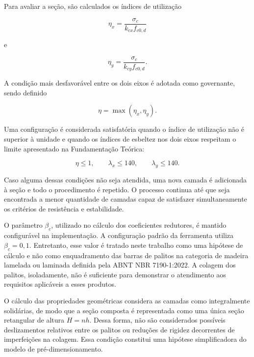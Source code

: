 Para avaliar a seção, são calculados os índices de utilização

\begin{equation}
    \eta_x =
    \frac{\sigma_c}{k_{cx}f_{c0,d}}
\end{equation}

e

\begin{equation}
    \eta_y =
    \frac{\sigma_c}{k_{cy}f_{c0,d}}.
\end{equation}

A condição mais desfavorável entre os dois eixos é adotada como governante, sendo definido

\begin{equation}
    \eta = \max(\eta_x,\eta_y).
\end{equation}

Uma configuração é considerada satisfatória quando o índice de utilização não é superior à unidade e quando os índices de esbeltez nos dois eixos respeitam o limite apresentado na Fundamentação Teórica:

\begin{equation}
    \eta \leq 1,
    \qquad
    \lambda_x \leq 140,
    \qquad
    \lambda_y \leq 140.
\end{equation}

Caso alguma dessas condições não seja atendida, uma nova camada é adicionada à seção e todo o procedimento é repetido. O processo continua até que seja encontrada a menor quantidade de camadas capaz de satisfazer simultaneamente os critérios de resistência e estabilidade.

O parâmetro \(\beta_c\), utilizado no cálculo dos coeficientes redutores, é mantido configurável na implementação. A configuração padrão da ferramenta utiliza \(\beta_c=0,1\). Entretanto, esse valor é tratado neste trabalho como uma hipótese de cálculo e não como enquadramento das barras de palitos na categoria de madeira lamelada ou laminada definida pela \acrshort{ABNT} \acrshort{NBR} 7190-1:2022. A colagem dos palitos, isoladamente, não é suficiente para demonstrar o atendimento aos requisitos aplicáveis a esses produtos.

O cálculo das propriedades geométricas considera as camadas como integralmente solidárias, de modo que a seção composta é representada como uma única seção retangular de altura \(H=nh\). Dessa forma, não são considerados possíveis deslizamentos relativos entre os palitos ou reduções de rigidez decorrentes de imperfeições na colagem. Essa condição constitui uma hipótese simplificadora do modelo de pré-dimensionamento.

